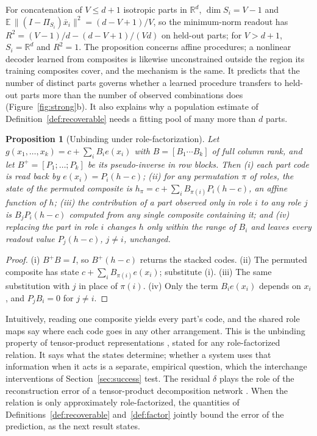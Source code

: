 \documentclass[10pt]{article}
\theoremstyle{plain}
\newtheorem{proposition}{Proposition}
\theoremstyle{remark}
\newcommand{\R}{\mathbb{R}}
\begin{document}
\noindent
For concatenation of $V \le d + 1$ isotropic parts in $\R^d$, $\dim S_i = V - 1$ and $\mathbb{E}\,\lVert(I - \Pi_{S_i})\bar{x}_i\rVert^2 = (d - V + 1)/V$, so the minimum-norm readout has $R^2 = (V-1)/d - (d - V + 1)/(Vd)$ on held-out parts; for $V > d + 1$, $S_i = \R^d$ and $R^2 = 1$. The proposition concerns affine procedures; a nonlinear decoder learned from composites is likewise unconstrained outside the region its training composites cover, and the mechanism is the same. It predicts that the number of distinct parts governs whether a learned procedure transfers to held-out parts more than the number of observed combinations does (Figure~\ref{fig:strong}b). It also explains why a population estimate of Definition~\ref{def:recoverable} needs a fitting pool of many more than $d$ parts.



\noindent

\begin{proposition}[Unbinding under role-factorization]
\label{prop:systematic}
Let $g(x_1, \ldots, x_k) = c + \sum_i B_i e(x_i)$ with $B = [B_1 \cdots B_k]$ of full column rank, and let $B^{+} = [P_1; \ldots; P_k]$ be its pseudo-inverse in row blocks. Then (i) each part code is read back by $e(x_i) = P_i(h - c)$; (ii) for any permutation $\pi$ of roles, the state of the permuted composite is $h_\pi = c + \sum_i B_{\pi(i)} P_i (h - c)$, an affine function of $h$; (iii) the contribution of a part observed only in role $i$ to any role $j$ is $B_j P_i (h - c)$ computed from any single composite containing it; and (iv) replacing the part in role $i$ changes $h$ only within the range of $B_i$ and leaves every readout value $P_j(h - c)$, $j \ne i$, unchanged.
\end{proposition}

\begin{proof}
(i) $B^{+}B = I$, so $B^{+}(h - c)$ returns the stacked codes. (ii) The permuted composite has state $c + \sum_i B_{\pi(i)} e(x_i)$; substitute (i). (iii) The same substitution with $j$ in place of $\pi(i)$. (iv) Only the term $B_i e(x_i)$ depends on $x_i$, and $P_j B_i = 0$ for $j \neq i$.
\end{proof}

\noindent
Intuitively, reading one composite yields every part's code, and the shared role maps say where each code goes in any other arrangement. This is the unbinding property of tensor-product representations \citep{smolensky1990}, stated for any role-factorized relation. It says what the states determine; whether a system uses that information when it acts is a separate, empirical question, which the interchange interventions of Section~\ref{sec:success} test. The residual $\delta$ plays the role of the reconstruction error of a tensor-product decomposition network \citep{mccoy2019}. When the relation is only approximately role-factorized, the quantities of Definitions~\ref{def:recoverable} and~\ref{def:factor} jointly bound the error of the prediction, as the next result states.
\end{document}
